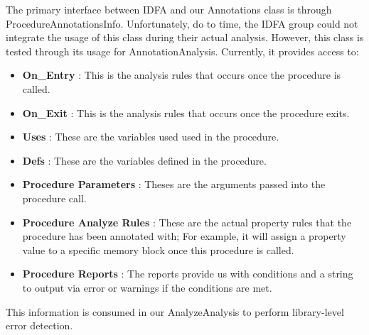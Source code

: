 The primary interface between IDFA and our Annotations class is through ProcedureAnnotationsInfo. Unfortunately, do to time, the IDFA group could not integrate the usage of this class during their actual analysis. However, this class is tested through its usage for AnnotationAnalysis. Currently, it provides access to:
\begin{itemize}
\item {\bf On\_Entry} : This is the analysis rules that occurs once the procedure is called.
\item {\bf On\_Exit} : This is the analysis rules that occurs once the procedure exits.
\item {\bf Uses} : These are the variables used used in the procedure.
\item {\bf Defs} : These are the variables defined in the procedure.
\item {\bf Procedure Parameters} : Theses are the arguments passed into the procedure call.
\item {\bf Procedure Analyze Rules} : These are the actual property rules that the procedure has been annotated with; For example, it will assign a property value to a specific memory block once this procedure is called.
\item {\bf Procedure Reports} : The reports provide us with conditions and a string to output via error or warnings if the conditions are met.
\end{itemize}

This information is consumed in our AnalyzeAnalysis to perform library-level error detection.